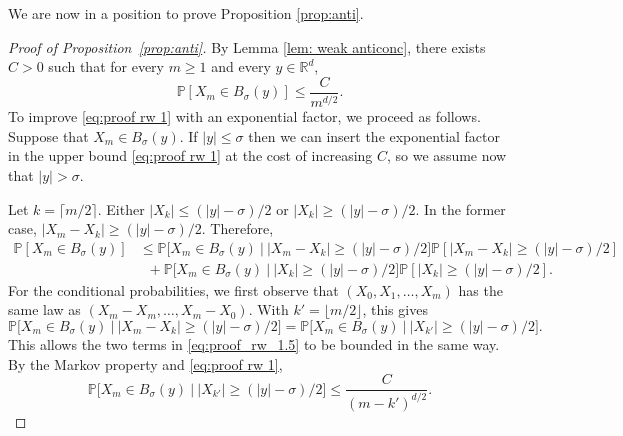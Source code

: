 \documentclass[11pt,a4paper]{article}
\numberwithin{equation}{section}
\theoremstyle{plain}
\theoremstyle{definition}
\newcommand\1{\mathds{1}}
\begin{document}
We are now in a position to prove Proposition \ref{prop:anti}.

\begin{proof}[Proof of Proposition~\textup{\ref{prop:anti}}]

By Lemma \ref{lem: weak anticonc}, there exists $C>0$ such that for every $m\geq 1$ and every $y\in \mathbb R^d$,
\begin{equation}\label{eq:proof rw 1}
	\mathbb P[X_m\in B_{\sigma}(y)]\leq \frac{C}{m^{d/2}}.
\end{equation}
To improve \eqref{eq:proof rw 1} with an exponential factor, we proceed as follows.
Suppose that $X_m\in B_{\sigma}(y)$.
If $|y|\le \sigma$ then we can insert the exponential factor in
the upper bound \eqref{eq:proof rw 1} at the cost of increasing $C$, so
we assume now that $|y|>\sigma$.

Let $k=\lceil m/2 \rceil$.  Either $|X_k| \le (|y|-\sigma)/2$ or $|X_k|\ge (|y|-\sigma)/2$.
In the former case, $|X_m-X_k|\ge(|y|-\sigma)/2$.  Therefore,
\begin{align}
    \mathbb P[X_m\in B_{\sigma}(y)]
    & \le
    \mathbb P\Big[X_m\in B_{\sigma}(y) \:\Big|\: |X_m-X_k|\ge (|y|-\sigma)/2\Big]
    \mathbb P[|X_m-X_k|\ge (|y|-\sigma)/2]
    \nonumber \\ & \;\; +
    \mathbb P\Big[X_m\in B_{\sigma}(y) \:\Big|\: |X_k|\ge(|y|-\sigma)/2\Big]
    \mathbb P[|X_k|\ge(|y|-\sigma)/2]
    .
\label{eq:proof_rw_1.5}
\end{align}
For the conditional probabilities, we first observe that
$(X_0,X_1,\ldots,X_m)$ has the same law as $(X_m-X_m,\ldots, X_m-X_0)$.
With $k'=\lfloor m/2\rfloor$, this gives
\begin{equation}
	\mathbb P\Big[X_m\in B_{\sigma}(y) \:\Big|\: |X_m-X_k|\ge (|y|-\sigma)/2\Big]
    =\mathbb P\Big[X_m\in B_{\sigma}(y) \:\Big|\: |X_{k'}|\ge (|y|-\sigma)/2\Big].
\end{equation}
This allows the two terms in \eqref{eq:proof_rw_1.5} to be bounded in the same way.
By the Markov property and \eqref{eq:proof rw 1},
\begin{equation}
    \mathbb P\Big[X_m\in B_{\sigma}(y) \:\Big|\: |X_{k'}|\ge (|y|-\sigma)/2\Big]
    \le
    \frac{C}{(m-k')^{d/2}}.
\end{equation}


\end{proof}
\end{document}
